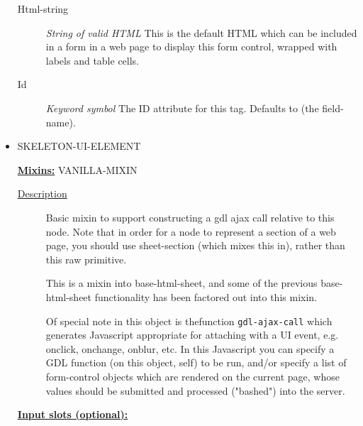 \documentclass [11pt]{book}
\begin{document}
\begin{itemize}
\begin{description}
\item [Html-string]
\emph{String of valid HTML} This is the default HTML which can be included in a form in a web page to display this form control, wrapped with labels and table cells.


\item [Id]
\emph{Keyword symbol} The ID attribute for this tag. Defaults to (the field-name).


\end{description}







\item {}SKELETON-UI-ELEMENT


\textbf{
\underline{Mixins:}} VANILLA-MIXIN





\begin{description}

\item [
\underline{Description}]


Basic mixin to support constructing a gdl ajax call 
relative to this node. Note that in order for a node to represent a section of a 
web page, you should use sheet-section (which mixes this in), rather than this raw 
primitive. 

This is a mixin into base-html-sheet, and some of the previous base-html-sheet 
functionality has been factored out into this mixin. 

Of special note in this object is thefunction \texttt{gdl-ajax-call} which generates 
Javascript appropriate for attaching with a UI event, e.g. onclick, onchange, 
onblur, etc. In this Javascript you can specify a GDL function (on this object, self) 
to be run, and/or specify a list of form-control objects which are rendered on 
the current page, whose values should be submitted and processed ("bashed") into the 
server.



\end{description}








\textbf{
\underline{Input slots (optional):}}

\begin{description}


\end{description}
\end{itemize}
\end{document}
